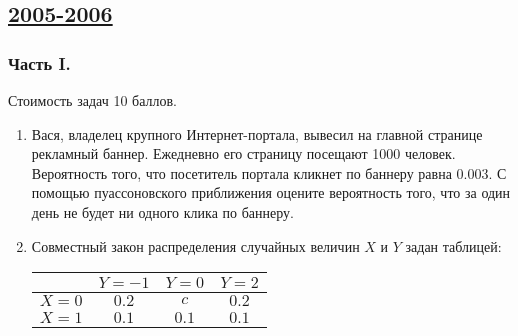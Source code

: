 \newpage
\subsection[2005-2006]{\hyperref[sec:sol_kr_02_2005_2006]{2005-2006}}
\label{sec:kr_02_2005_2006}


\subsubsection*{Часть I.}

Стоимость задач 10 баллов.
\begin{enumerate}
\item Вася, владелец крупного Интернет-портала, вывесил на главной странице рекламный
баннер. Ежедневно его страницу посещают 1000 человек. Вероятность того, что посетитель
портала кликнет по баннеру равна 0.003. С помощью пуассоновского приближения оцените
вероятность того, что за один день не будет ни одного клика по баннеру.
\item Совместный закон распределения случайных величин  $X$  и  $Y$  задан таблицей:

\begin{center}
\begin{tabular}{@{}lccc@{}}
\toprule
    & $Y=-1$ & $Y=0$ & $Y=2$ \\ \midrule
$X=0$ & $0.2$  & $c$   & $0.2$ \\
$X=1$ & $0.1$  & $0.1$ & $0.1$ \\ \bottomrule
\end{tabular}
\end{center}


\end{enumerate}
